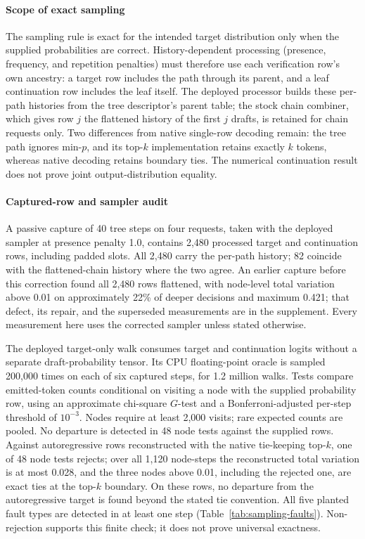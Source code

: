 \paragraph{Scope of exact sampling}
The sampling rule is exact for the intended target distribution only when the supplied probabilities are correct. History-dependent processing (presence, frequency, and repetition penalties) must therefore use each verification row's own ancestry: a target row includes the path through its parent, and a leaf continuation row includes the leaf itself. The deployed processor builds these per-path histories from the tree descriptor's parent table; the stock chain combiner, which gives row $j$ the flattened history of the first $j$ drafts, is retained for chain requests only. Two differences from native single-row decoding remain: the tree path ignores min-$p$, and its top-$k$ implementation retains exactly $k$ tokens, whereas native decoding retains boundary ties. The numerical continuation result does not prove joint output-distribution equality.

\paragraph{Captured-row and sampler audit}
A passive capture of 40 tree steps on four requests, taken with the deployed sampler at presence penalty 1.0, contains 2,480 processed target and continuation rows, including padded slots. All 2,480 carry the per-path history; 82 coincide with the flattened-chain history where the two agree. An earlier capture before this correction found all 2,480 rows flattened, with node-level total variation above 0.01 on approximately 22\% of deeper decisions and maximum 0.421; that defect, its repair, and the superseded measurements are in the supplement. Every measurement here uses the corrected sampler unless stated otherwise.

The deployed target-only walk consumes target and continuation logits without a separate draft-probability tensor. Its CPU floating-point oracle is sampled 200,000 times on each of six captured steps, for 1.2 million walks. Tests compare emitted-token counts conditional on visiting a node with the supplied probability row, using an approximate chi-square $G$-test and a Bonferroni-adjusted per-step threshold of $10^{-3}$. Nodes require at least 2,000 visits; rare expected counts are pooled. No departure is detected in 48 node tests against the supplied rows. Against autoregressive rows reconstructed with the native tie-keeping top-$k$, one of 48 node tests rejects; over all 1,120 node-steps the reconstructed total variation is at most 0.028, and the three nodes above 0.01, including the rejected one, are exact ties at the top-$k$ boundary. On these rows, no departure from the autoregressive target is found beyond the stated tie convention. All five planted fault types are detected in at least one step (Table~\ref{tab:sampling-faults}). Non-rejection supports this finite check; it does not prove universal exactness.

